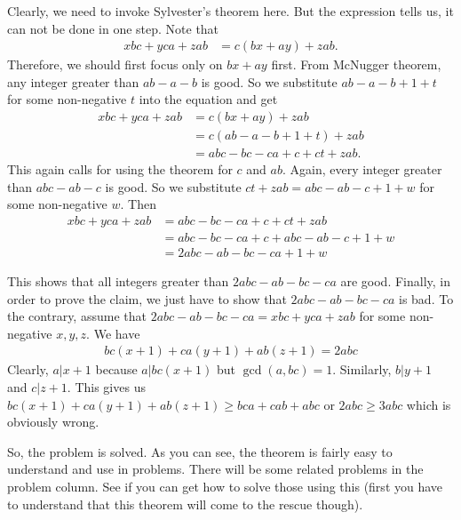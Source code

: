 \documentclass{subfile}
\begin{document}
	\begin{solution}
		Clearly, we need to invoke Sylvester's theorem here. But the expression tells us, it can not be done in one step. Note that
			\begin{align*}
				xbc+yca+zab & = c(bx+ay)+zab.
			\end{align*}
		Therefore, we should first focus only on $bx+ay$ first. From McNugger theorem, any integer greater than $ab-a-b$ is good. So we substitute $ab-a-b+1+t$ for some non-negative $t$ into the equation and get
			\begin{align*}
				xbc+yca+zab & = c(bx+ay)+zab\\
							& = c(ab-a-b+1+t)+zab\\
							& = abc-bc-ca+c+ct+zab.
			\end{align*}
		This again calls for using the theorem for $c$ and $ab$. Again, every integer greater than $abc-ab-c$ is good. So we substitute $ct+zab=abc-ab-c+1+w$ for some non-negative $w$. Then
			\begin{align*}
				xbc+yca+zab & = abc-bc-ca+c+ct+zab\\
							& = abc-bc-ca+c+abc-ab-c+1+w\\
							& = 2abc-ab-bc-ca+1+w			
			\end{align*}
	\end{solution}
This shows that all integers greater than $2abc-ab-bc-ca$ are good.	Finally, in order to prove the claim, we just have to show that $2abc-ab-bc-ca$ is bad. To the contrary, assume that $2abc-ab-bc-ca=xbc+yca+zab$ for some non-negative $x,y,z$. We have
	\begin{align*}
		bc(x+1)+ca(y+1)+ab(z+1)=2abc
	\end{align*}
Clearly, $a|x+1$ because $a|bc(x+1)$ but $\gcd(a,bc)=1$. Similarly, $b|y+1$ and $c|z+1$. This gives us $bc(x+1)+ca(y+1)+ab(z+1)\geq bca+cab+abc$ or $2abc\geq3abc$ which is obviously wrong.
	
So, the problem is solved. As you can see, the theorem is fairly easy to understand and use in problems. There will be some related problems in the problem column. See if you can get how to solve those using this (first you have to understand that this theorem will come to the rescue though).
\end{document}
